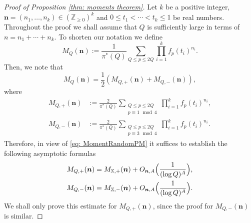 \documentclass[10pt]{amsart}
\theoremstyle{plain}
\theoremstyle{definition}
\newcommand{\X}{\mathbb{X}}
\newcommand{\un}{\boldsymbol{n}}
\begin{document}
\begin{proof}[Proof of Proposition \ref{thm: moments theorem}]
Let $k$ be a positive integer, $\boldsymbol{n} = (n_1, \dots, n_k)\in (\mathbb{Z}_{\geq 0})^k$ and $0 \leq t_1 < \cdots < t_k \leq 1$ be real numbers.
Throughout the proof we shall assume that $Q$ is sufficiently large in terms of $n=n_1+\cdots+n_k$. To shorten our notation we define
\[
M_{Q}(\boldsymbol{n}):= \frac{1}{\pi^*(Q)} \sum_{Q\leq p \leq 2Q} \prod_{i =1}^k f_{p}(t_i)^{n_i}.
\]
Then, we note that
\[M_{Q}(\boldsymbol{n})= \frac{1}{2}\left(M_{Q,+}(\boldsymbol{n})+ M_{Q,-}(\boldsymbol{n})\right),\]
where
\begin{equation}\label{eq: moment sequence}
\begin{aligned}
M_{Q,+}(\boldsymbol{n})&:= \frac{2}{\pi^*(Q)} \sum_{\substack{Q\leq p \leq 2Q\\ p \equiv 1 \, \bmod 4}} \prod_{i =1}^k f_{p}(t_i)^{n_i},\\
M_{Q,-}(\boldsymbol{n})&:= \frac{2}{\pi^*(Q)} \sum_{\substack{Q\leq p \leq 2Q\\ p \equiv 3 \, \bmod 4}} \prod_{i =1}^k f_{p}(t_i)^{n_i}.
\end{aligned}
\end{equation}
Therefore, in view of \eqref{eq: MomentRandomPM} it suffices to establish the following asymptotic formulas
\begin{equation}\label{eq: AsymptoticPlusMinus}
\begin{aligned}
M_{Q, +}(\boldsymbol{n}) &= M_{\X, +}(\boldsymbol{n}) + O_{\boldsymbol{n},A}\Bigl(\frac{1}{(\log Q)^{A}}\Bigr),\\
M_{Q, -}(\boldsymbol{n}) &= M_{\X, -}(\boldsymbol{n}) + O_{\boldsymbol{n},A}\Bigl(\frac{1}{(\log Q)^{A}}\Bigr).
\end{aligned}
\end{equation}
We shall only prove this estimate for $M_{Q, +}(\boldsymbol{n})$, since the proof for $M_{Q, -}(\un)$ is similar.


\end{proof}
\end{document}
